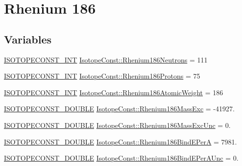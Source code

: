 \hypertarget{group___isotope_const-_rhenium-_re186}{}\section{Rhenium 186}
\label{group___isotope_const-_rhenium-_re186}
\subsection*{Variables}
\begin{DoxyCompactItemize}
\item 
\mbox{\hyperlink{group___isotope_const-_macros_ga5f18360b3e99483a35c32d789e62621c}{I\+S\+O\+T\+O\+P\+E\+C\+O\+N\+S\+T\+\_\+\+I\+NT}} \mbox{\hyperlink{group___isotope_const-_rhenium-_re186_ga30ad8671df1df2496d15b8abe41889d5}{Isotope\+Const\+::\+Rhenium186\+Neutrons}} = 111
\item 
\mbox{\hyperlink{group___isotope_const-_macros_ga5f18360b3e99483a35c32d789e62621c}{I\+S\+O\+T\+O\+P\+E\+C\+O\+N\+S\+T\+\_\+\+I\+NT}} \mbox{\hyperlink{group___isotope_const-_rhenium-_re186_ga57298cc218700a4dbfe1ee3287759610}{Isotope\+Const\+::\+Rhenium186\+Protons}} = 75
\item 
\mbox{\hyperlink{group___isotope_const-_macros_ga5f18360b3e99483a35c32d789e62621c}{I\+S\+O\+T\+O\+P\+E\+C\+O\+N\+S\+T\+\_\+\+I\+NT}} \mbox{\hyperlink{group___isotope_const-_rhenium-_re186_ga85306f0298e2593f535ec868c75dafc5}{Isotope\+Const\+::\+Rhenium186\+Atomic\+Weight}} = 186
\item 
\mbox{\hyperlink{group___isotope_const-_macros_ga8f45a7272ce02c0b4c65c44636ed719a}{I\+S\+O\+T\+O\+P\+E\+C\+O\+N\+S\+T\+\_\+\+D\+O\+U\+B\+LE}} \mbox{\hyperlink{group___isotope_const-_rhenium-_re186_ga3d45e7752b94a59f6e7998d04e1d72b9}{Isotope\+Const\+::\+Rhenium186\+Mass\+Exc}} = -\/41927.
\item 
\mbox{\hyperlink{group___isotope_const-_macros_ga8f45a7272ce02c0b4c65c44636ed719a}{I\+S\+O\+T\+O\+P\+E\+C\+O\+N\+S\+T\+\_\+\+D\+O\+U\+B\+LE}} \mbox{\hyperlink{group___isotope_const-_rhenium-_re186_ga6314c7330a7841b097d086d27abfc71e}{Isotope\+Const\+::\+Rhenium186\+Mass\+Exc\+Unc}} = 0.
\item 
\mbox{\hyperlink{group___isotope_const-_macros_ga8f45a7272ce02c0b4c65c44636ed719a}{I\+S\+O\+T\+O\+P\+E\+C\+O\+N\+S\+T\+\_\+\+D\+O\+U\+B\+LE}} \mbox{\hyperlink{group___isotope_const-_rhenium-_re186_ga3e74f50ddbcc54ad31c89fe4e6d6fff7}{Isotope\+Const\+::\+Rhenium186\+Bind\+E\+PerA}} = 7981.
\item 
\mbox{\hyperlink{group___isotope_const-_macros_ga8f45a7272ce02c0b4c65c44636ed719a}{I\+S\+O\+T\+O\+P\+E\+C\+O\+N\+S\+T\+\_\+\+D\+O\+U\+B\+LE}} \mbox{\hyperlink{group___isotope_const-_rhenium-_re186_gad6b82ea2e9b4ede26ddc15c23066050c}{Isotope\+Const\+::\+Rhenium186\+Bind\+E\+Per\+A\+Unc}} = 0.

\end{DoxyCompactItemize}
